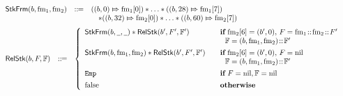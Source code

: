\begin{figure}[!t]
    \centering
    \vspace*{-0.5em}
    \small
    \[
        \begin{array}{l}
            \hspace*{-0.15em}
            \begin{array}{lcl}
                \RelStkFm{\block}{\fm_1}{\fm_2} & \define & 
                (\relmsto{(\block, 0)}{\fm_1[0]}) \sepstar \dots \sepstar 
                (\relmsto{(\block, 28)}{\fm_1[7]}) \\
                & & \quad \sepstar 
                (\relmsto{(\block, 32)}{\fm_2[0]}) \sepstar 
                \dots \sepstar
                (\relmsto{(\block, 60)}{\fm_2[7]})
            \end{array} \\
            \\[-5pt]
            \hspace*{-0.15em}
            \begin{array}{lcl}
                \RelStk{\block}{\Wstack}{\hWstk} & \define & 
                \left\{
                    \begin{array}{ll}
                        \RelStkFm{\block}{\notCare}{\notCare} \sepstar
                        \RelStk{\block'}{\Wstack'}{\hWstk'} & 
                            \quad \cif \  
                            \fm_2[6] = (\block', 0), \, \Wstack = \fm_1 \stCons \fm_2 \stCons \Wstack' \\
                            & \quad \ \ \hWstk = (\block, \fm_1, \fm_2) \stCons \hWstk' \\
                            \\[-8pt]
                        \RelStkFm{\block}{\fm_1}{\fm_2} \sepstar 
                        \RelStk{\block'}{\Wstack'}{\hWstk'} & 
                            \quad \cif \ 
                            \fm_2[6] = (\block', 0), \, \Wstack = \nil \\
                            & \quad \ \ \hWstk = (\block, \fm_1, \fm_2) \stCons \hWstk' \\
                            \\[-8pt]
                        \empAst & \quad \cif \ \Wstack = \nil, \hWstk = \nil \\
                            \\[-8pt]
                        \afalse & \quad \otherwise
                    \end{array}
                \right. 

\end{array}
\end{array}\]
\end{figure}
